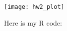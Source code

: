 \documentclass[11pt]{article}
\theoremstyle{definition}
\begin{document}
\begin{itemize}
\begin{itemize}
                \begin{center}
                    \texttt{[image: hw2\_plot]} 
                \end{center}
        \end{itemize}
        Here is my R code: \\
        
\end{itemize}
\end{document}
